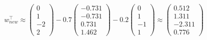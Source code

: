 \documentclass[a4paper, 10pt]{article}
\begin{document}
$$
w_{new}^\top \approx \left(\begin{array}{c}
    0  \\
    1  \\
    -2 \\
    2
\end{array}\right) - 0.7 \left(\begin{array}{c}
    -0.731 \\
    -0.731 \\
    0.731  \\
    1.462
\end{array}\right) - 0.2 \left(\begin{array}{c}
    0  \\
    1  \\
    -1 \\
    1
\end{array}\right) \approx
\left(\begin{array}{c}
    0.512 \\
    1.311 \\
    -2.311 \\
    0.776
\end{array}\right)
$$
\end{document}

